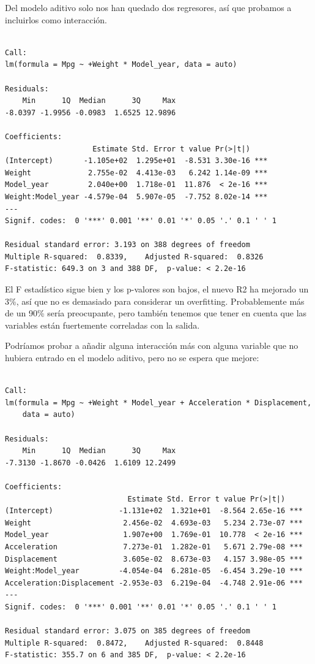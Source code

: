 Del modelo aditivo solo nos han quedado dos regresores, así que probamos a incluirlos como interacción.

\begin{verbatim}

Call:
lm(formula = Mpg ~ +Weight * Model_year, data = auto)

Residuals:
    Min      1Q  Median      3Q     Max 
-8.0397 -1.9956 -0.0983  1.6525 12.9896 

Coefficients:
                    Estimate Std. Error t value Pr(>|t|)    
(Intercept)       -1.105e+02  1.295e+01  -8.531 3.30e-16 ***
Weight             2.755e-02  4.413e-03   6.242 1.14e-09 ***
Model_year         2.040e+00  1.718e-01  11.876  < 2e-16 ***
Weight:Model_year -4.579e-04  5.907e-05  -7.752 8.02e-14 ***
---
Signif. codes:  0 '***' 0.001 '**' 0.01 '*' 0.05 '.' 0.1 ' ' 1

Residual standard error: 3.193 on 388 degrees of freedom
Multiple R-squared:  0.8339,    Adjusted R-squared:  0.8326 
F-statistic: 649.3 on 3 and 388 DF,  p-value: < 2.2e-16
\end{verbatim}

El F estadístico sigue bien y los p-valores son bajos, el nuevo R2 ha mejorado un 3\%, así que no es demasiado para considerar un overfitting. Probablemente más de un 90\% sería preocupante, pero también tenemos que tener en cuenta que las variables están fuertemente correladas con la salida.

Podríamos probar a añadir alguna interacción más con alguna variable que no hubiera entrado en el modelo aditivo, pero no se espera que mejore:

\begin{verbatim}

Call:
lm(formula = Mpg ~ +Weight * Model_year + Acceleration * Displacement, 
    data = auto)

Residuals:
    Min      1Q  Median      3Q     Max 
-7.3130 -1.8670 -0.0426  1.6109 12.2499 

Coefficients:
                            Estimate Std. Error t value Pr(>|t|)    
(Intercept)               -1.131e+02  1.321e+01  -8.564 2.65e-16 ***
Weight                     2.456e-02  4.693e-03   5.234 2.73e-07 ***
Model_year                 1.907e+00  1.769e-01  10.778  < 2e-16 ***
Acceleration               7.273e-01  1.282e-01   5.671 2.79e-08 ***
Displacement               3.605e-02  8.673e-03   4.157 3.98e-05 ***
Weight:Model_year         -4.054e-04  6.281e-05  -6.454 3.29e-10 ***
Acceleration:Displacement -2.953e-03  6.219e-04  -4.748 2.91e-06 ***
---
Signif. codes:  0 '***' 0.001 '**' 0.01 '*' 0.05 '.' 0.1 ' ' 1

Residual standard error: 3.075 on 385 degrees of freedom
Multiple R-squared:  0.8472,    Adjusted R-squared:  0.8448 
F-statistic: 355.7 on 6 and 385 DF,  p-value: < 2.2e-16
\end{verbatim}

